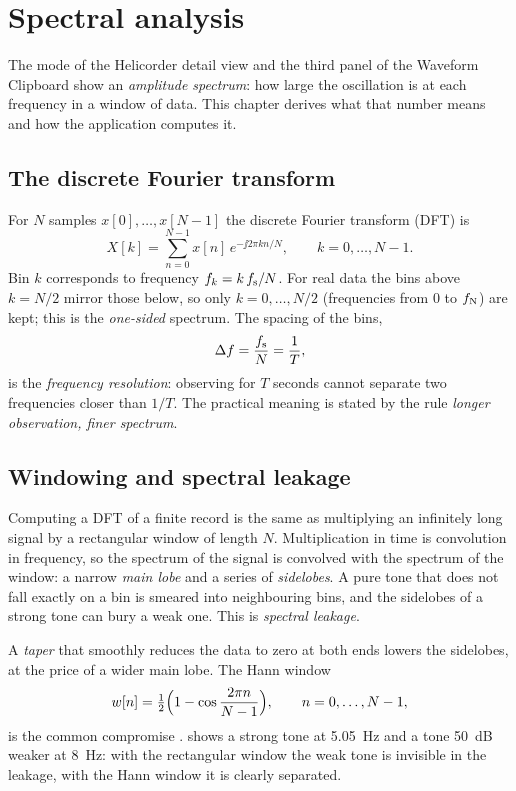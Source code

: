 \chapter{Spectral analysis}\label{ch:spectral}

The  mode of the Helicorder detail view and the third panel of the Waveform Clipboard show an
\emph{amplitude spectrum}: how large the oscillation is at each frequency in a window of data. This chapter derives
what that number means and how the application computes it.

\section{The discrete Fourier transform}
For $N$ samples $x[0],\dots,x[N-1]$ the discrete Fourier transform (DFT) is
\begin{equation}\label{eq:dft}
  X[k] = \sum_{n=0}^{N-1} x[n]\,e^{-\jj 2\pi k n/N}, \qquad k=0,\dots,N-1.
\end{equation}
Bin $k$ corresponds to frequency $f_k = k\,f_{\mathrm{s}}/N$. For real data the bins above $k=N/2$ mirror those below, so only
$k=0,\dots,N/2$ (frequencies from 0 to $f_{\mathrm{N}}$) are kept; this is the \emph{one-sided} spectrum. The spacing of the bins,
\begin{equation}\label{eq:resolution}
  \Delta f = \frac{f_{\mathrm{s}}}{N} = \frac{1}{T},
\end{equation}
is the \emph{frequency resolution}: observing for $T$ seconds cannot separate two frequencies closer than $1/T$.
The practical meaning is stated by the rule \emph{longer observation, finer spectrum}.

\section{Windowing and spectral leakage}
Computing a DFT of a finite record is the same as multiplying an infinitely long signal by a rectangular window
of length $N$. Multiplication in time is convolution in frequency, so the spectrum of the signal is convolved with
the spectrum of the window: a narrow \emph{main lobe} and a series of \emph{sidelobes}. A pure tone that does not
fall exactly on a bin is smeared into neighbouring bins, and the sidelobes of a strong tone can bury a weak one. This
is \emph{spectral leakage}.

A \emph{taper} that smoothly reduces the data to zero at both ends lowers the sidelobes, at the price of a wider
main lobe. The Hann window
\begin{equation}\label{eq:hann}
  w[n] = \tfrac12\Bigl(1-\cos\frac{2\pi n}{N-1}\Bigr),\qquad n=0,\dots,N-1,
\end{equation}
is the common compromise \parencite{harris1978}.  shows a strong tone at 5.05~Hz and a tone 50~dB
weaker at 8~Hz: with the rectangular window the weak tone is invisible in the leakage, with the Hann window it is
clearly separated.

